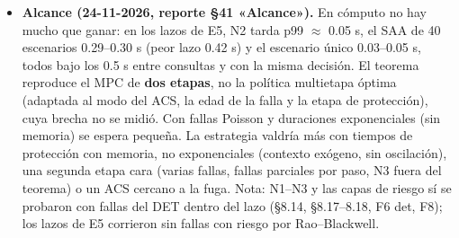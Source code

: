 \documentclass[11pt,a4paper]{article}
\newcommand{\codeus}{\textunderscore\allowbreak}
\newcommand{\code}[1]{{\small\ttfamily\let\_\codeus #1}}
\begin{document}
\begin{itemize}
\item \textbf{Alcance (24-11-2026, reporte \S{}41 «Alcance»).} En cómputo no hay mucho que ganar: en los lazos de E5, N2 tarda p99 $\approx$ 0.05 s, el SAA de 40 escenarios 0.29–0.30 s (peor lazo 0.42 s) y el escenario único 0.03–0.05 s, todos bajo los 0.5 s entre consultas y con la misma decisión. El teorema reproduce el MPC de \textbf{dos etapas}, no la política multietapa óptima (adaptada al modo del ACS, la edad de la falla y la etapa de protección), cuya brecha no se midió. Con fallas Poisson y duraciones exponenciales (sin memoria) se espera pequeña. La estrategia valdría más con tiempos de protección con memoria, no exponenciales (contexto exógeno, sin oscilación), una segunda etapa cara (varias fallas, fallas parciales por paso, N3 fuera del teorema) o un ACS cercano a la fuga. Nota: N1–N3 y las capas de riesgo sí se probaron con fallas del DET dentro del lazo (\S{}8.14, \S{}8.17–8.18, F6 \code{det}, F8); los lazos de E5 corrieron sin fallas con riesgo por Rao–Blackwell.
\end{itemize}
\end{document}

